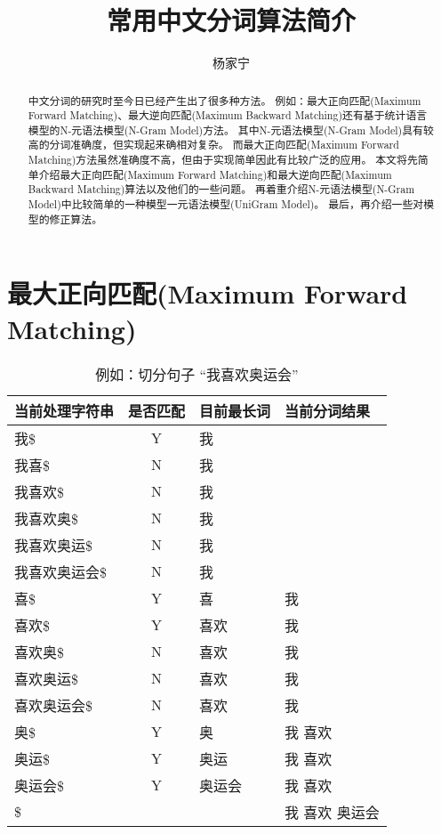 \documentclass[12pt,a4paper]{article}
\title{常用中文分词算法简介}
\author{杨家宁}
\def\maxforward{最大正向匹配{\serif(Maximum Forward Matching)}}
\def\maxbackward{最大逆向匹配{\serif(Maximum Backward Matching)}}
\def\NGram{N-元语法模型{\serif(N-Gram Model)}}
\def\UniGram{一元语法模型{\serif(UniGram Model)}}
\begin{document}
\maketitle

\def\abstractname{\hei 摘~~要}
\begin{abstract}
中文分词的研究时至今日已经产生出了很多种方法。
例如：\maxforward 、\maxbackward 还有基于统计语言模型的\NGram 方法。
其中\NGram 具有较高的分词准确度，但实现起来确相对复杂。
而\maxforward 方法虽然准确度不高，但由于实现简单因此有比较广泛的应用。
本文将先简单介绍\maxforward 和\maxbackward 算法以及他们的一些问题。
再着重介绍\NGram 中比较简单的一种模型\UniGram 。
最后，再介绍一些对模型的修正算法。
\end{abstract}

\section{\maxforward}
\begin{table}
\caption{例如：切分句子 “我喜欢奥运会”}
\label{tbl_maxforward}
	\begin{center}
		\begin{tabular}{l|c|l|l}
			当前处理字符串 & 是否匹配    & 目前最长词 & 当前分词结果   \\
			\hline
			我\$           & {\serif Y}  & 我         &                \\
			我喜\$         & {\serif N}  & 我         &                \\
			我喜欢\$       & {\serif N}  & 我         &                \\
			我喜欢奥\$     & {\serif N}  & 我         &                \\
			我喜欢奥运\$   & {\serif N}  & 我         &                \\
			我喜欢奥运会\$ & {\serif N}  & 我         &                \\
			喜\$           & {\serif Y}  & 喜         & 我             \\ 
			喜欢\$         & {\serif Y}  & 喜欢       & 我             \\ 
			喜欢奥\$       & {\serif N}  & 喜欢       & 我             \\ 
			喜欢奥运\$     & {\serif N}  & 喜欢       & 我             \\ 
			喜欢奥运会\$   & {\serif N}  & 喜欢       & 我             \\ 
			奥\$           & {\serif Y}  & 奥         & 我 喜欢        \\ 
			奥运\$         & {\serif Y}  & 奥运       & 我 喜欢        \\ 
			奥运会\$       & {\serif Y}  & 奥运会     & 我 喜欢        \\ 
		    \$             &             &            & 我 喜欢 奥运会 \\
		\end{tabular}
	\end{center}
\end{table}
\end{document}
